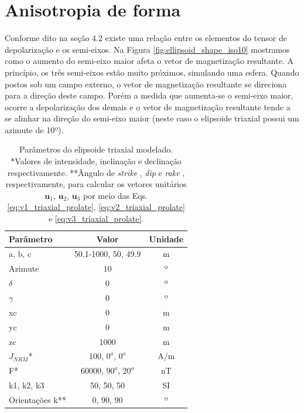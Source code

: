 \section{Anisotropia de forma}

Conforme dito na seção 4.2 existe uma relação entre os elementos do tensor de depolarização e os semi-eixos. Na Figura \ref{fig:ellipsoid_shape_iso10} mostramos como o aumento do semi-eixo maior afeta o vetor de magnetização resultante. A princípio, os três semi-eixos estão muito próximos, simulando uma esfera. Quando postos sob um campo externo, o vetor de magnetização resultante se direciona para a direção deste campo. Porém a medida que aumenta-se o semi-eixo maior, ocorre a depolarização dos demais e o vetor de magnetização resultante tende a se alinhar na direção do semi-eixo maior (neste caso o elipsoide triaxial possui um azimute de 10$º$).

\vspace{2cm}

\begin{table}[h!]
	\begin{center}
		\begin{tabular}{|l|c|c|}
			\hline
			\textbf{Parâmetro}  & \textbf{Valor}  & \textbf{Unidade }\\
			\hline 
			a, b, c  & 50.1-1000, 50, 49.9 & m\\
			\hline
			Azimute   & $10$ & º \\
			\hline
			$\delta$    & $0$ & º\\
			\hline
			$\gamma$   & $0$  & º\\
			\hline
			xc   & 0  & m\\
			\hline          
			yc   & 0  & m\\
			\hline                
			zc   & 1000  & m\\
			\hline
			$J_{NRM}$*  & 100, $0^o$, $0^o$ & A/m \\
			\hline
			F*    & 60000, $90^o$, $20^o$ & nT\\
			\hline
			k1, k2, k3   & 50, 50, 50  & SI\\
			\hline
			Orientações k**   & $0$, $90$, $90$  & º\\
			\hline
		\end{tabular}
		\caption{Parâmetros do elipsoide triaxial modelado. *Valores de intensidade, inclinação e declinação respectivamente. **Ângulo de \textit{strike} , \textit{dip}  e \textit{rake} , respectivamente, para calcular os vetores unitários $\mathbf{u}_{1}$, $\mathbf{u}_{2}$, $\mathbf{u}_{3}$ por meio das Eqs. \ref{eq:v1_triaxial_prolate}, \ref{eq:v2_triaxial_prolate} e \ref{eq:v3_triaxial_prolate}.}
	\end{center}
	\label{tab:ellipsoid_shape_iso10}
\end{table}

